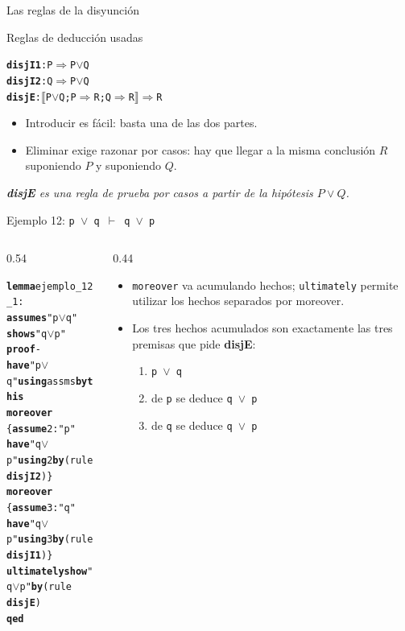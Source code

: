 \documentclass[11pt,aspectratio=169]{beamer}
\newcommand{\sOr}{\(\vee\)}
\newcommand{\sMeta}{\(\Longrightarrow\)}
\newcommand{\sTurn}{\(\vdash\)}
\newcommand{\sLb}{\(\llbracket\)}
\newcommand{\sRb}{\(\rrbracket\)}
\newcommand{\kw}[1]{\textcolor{isaCmd}{\textbf{#1}}}
\newcommand{\str}[1]{\textcolor{isaStr}{#1}}
\newcommand{\Rn}[1]{\textcolor{granate}{\textbf{#1}}}
\newcommand{\R}[1]{{\setlength{\fboxsep}{1pt}%
  \colorbox{resalte}{\ttfamily\bfseries\textcolor{granate}{#1}}}}
\newcommand{\nota}[1]{{\small\itshape\color{gray} #1}}
\begin{document}
\begin{frame}[fragile]{Las reglas de la disyunción}
  \begin{block}{Reglas de deducción usadas}
\begin{alltt}\footnotesize
\Rn{disjI1}: P \sMeta{} P \sOr{} Q
\Rn{disjI2}: Q \sMeta{} P \sOr{} Q
\Rn{disjE}:  \sLb{}P \sOr{} Q; P \sMeta{} R; Q \sMeta{} R\sRb{} \sMeta{} R
\end{alltt}
\end{block}
  \pause
  \begin{itemize}
    \item Introducir es fácil: basta una de las dos partes.
    \pause
    \item \alert{Eliminar exige razonar por casos}: hay que llegar a la
      misma conclusión $R$ suponiendo $P$ y suponiendo $Q$.
  \end{itemize}
  \vfill
  \pause
  \nota{\Rn{disjE} es una regla de prueba por casos a partir de la hipótesis $P \vee Q$.}
\end{frame}

\begin{frame}[fragile]{Ejemplo 12: \texttt{p \sOr{} q \sTurn{} q \sOr{} p}}
  \begin{columns}[T]
    \begin{column}{0.54\textwidth}
\begin{alltt}\footnotesize
\kw{lemma} ejemplo_12_1:
  \kw{assumes} \str{"p \sOr{} q"}
  \kw{shows} \str{"q \sOr{} p"}
\kw{proof} -
  \kw{have} \str{"p \sOr{} q"} \kw{using} assms \kw{by} \kw{this}
  \kw{moreover}
  \{ \kw{assume} 2: \str{"p"}
    \kw{have} \str{"q \sOr{} p"} \kw{using} 2 \kw{by} (rule \R{disjI2}) \}
  \kw{moreover}
  \{ \kw{assume} 3: \str{"q"}
    \kw{have} \str{"q \sOr{} p"} \kw{using} 3 \kw{by} (rule \R{disjI1}) \}
  \kw{ultimately} \kw{show} \str{"q \sOr{} p"} \kw{by} (rule \R{disjE})
\kw{qed}
\end{alltt}
    \end{column}
    \begin{column}{0.44\textwidth}
      \footnotesize
      \begin{itemize}
        \item<2-> \texttt{moreover} va \alert{acumulando} hechos;
          \texttt{ultimately} permite utilizar los hechos separados por moreover.\
        \item<3-> Los tres hechos acumulados son exactamente las tres
          premisas que pide \Rn{disjE}:
          \begin{enumerate}
            \item<4-> \texttt{p \sOr{} q}
            \item<4-> de \texttt{p} se deduce  \texttt{q \sOr{} p}
            \item<4-> de \texttt{q} se deduce \texttt{q \sOr{} p}
          \end{enumerate}
      \end{itemize}
    \end{column}
  \end{columns}
\end{frame}
\end{document}
